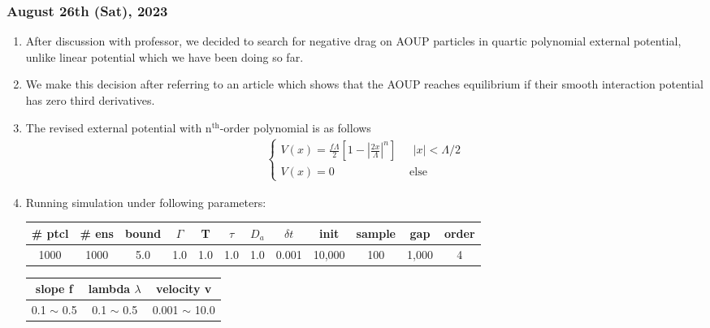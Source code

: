 \documentclass[12pt]{scrartcl}
\numberwithin{equation}{subsubsection}
\begin{document}
\subsubsection{August 26th (Sat), 2023}
\begin{enumerate}
\item After discussion with professor, we decided to search for negative drag on AOUP particles in quartic polynomial external potential,
unlike linear potential which we have been doing so far. 

\item We make this decision after referring to an article which shows that the AOUP reaches equilibrium if their 
smooth interaction potential has zero third derivatives.\cite{Bonila2019}

\item The revised external potential with n$^{\mathrm{th}}$-order polynomial is as follows
\begin{align}
    \begin{cases}
        V(x) = \frac{f\Lambda}{2}\left[1-\left|\frac{2x}{\Lambda}\right|^n\right]&\text{ $|x|<\Lambda/2$}\\
        V(x) = 0 &\text{ else}
    \end{cases}
\end{align}

\item Running simulation under following parameters:
\begin{center}
    \begin{tabular}{||c|c|c|c|c|c|c|c|c|c|c|c||} 
        \hline
        \# ptcl & \# ens & bound & $\Gamma$ & T & $\tau$ & $D_a$ & $\delta t$ & init & sample & gap & order \\
        \hline\hline
        1000 & 1000 & 5.0 & 1.0 & 1.0 & 1.0 & 1.0 & 0.001 & 10,000 & 100 & 1,000 & 4\\
        \hline
    \end{tabular}
\end{center}

\begin{center}
    \begin{tabular}{||c|c|c||} 
        \hline
        slope f & lambda $\lambda$ & velocity v \\
        \hline\hline
        0.1 $\sim$ 0.5 & 0.1 $\sim$ 0.5 & 0.001 $\sim$ 10.0\\
        \hline
    \end{tabular}
\end{center}


\end{enumerate}
\end{document}
